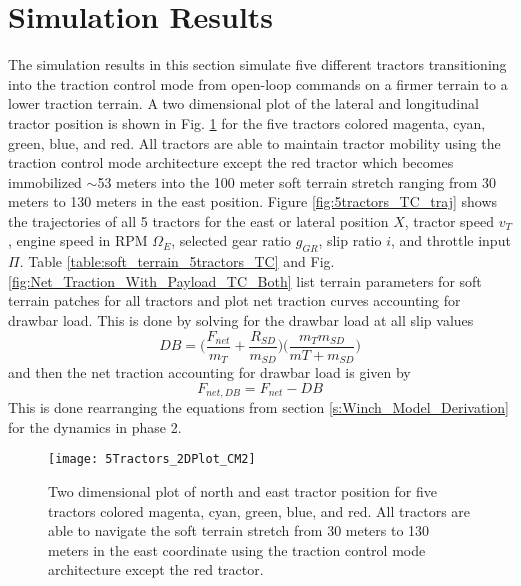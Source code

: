 \section{Simulation Results}
\label{s:SRTC}
The simulation results in this section simulate five different tractors transitioning into the traction control mode from open-loop commands on a firmer terrain to a lower traction terrain. A two dimensional plot of the lateral and longitudinal tractor position is shown in Fig. \ref{fig:5Tractors_2DPlot_CM2} for the five tractors colored magenta, cyan, green, blue, and red. All tractors are able to maintain tractor mobility using the traction control mode architecture except the red tractor which becomes immobilized $\sim$53 meters into the 100 meter soft terrain stretch ranging from 30 meters to 130 meters in the east position. Figure \ref{fig:5tractors_TC_traj} shows the trajectories of all 5 tractors for the east or lateral position $X$, tractor speed $v_T$, engine speed in RPM $\Omega_E$, selected gear ratio $g_{GR}$, slip ratio $i$, and throttle input $\Pi$. Table \ref{table:soft_terrain_5tractors_TC} and Fig. \ref{fig:Net_Traction_With_Payload_TC_Both} list terrain parameters for soft terrain patches for all tractors and plot net traction curves accounting for drawbar load. This is done by solving for the drawbar load at all slip values
\begin{equation}
    DB = \Bigg( \frac{F_{net}}{m_T} + \frac{R_{SD}}{m_{SD}}\Bigg)  \Bigg( \frac{m_Tm_{SD}}{mT+m_{SD}} \Bigg)
\end{equation}
and then the net traction accounting for drawbar load is given by 
\begin{equation*}
    F_{net,DB} = F_{net} - DB
\end{equation*}
This is done rearranging the equations from section \ref{s:Winch_Model_Derivation} for the dynamics in phase 2.
\begin{figure}[htbp]
    \centering
    \texttt{[image: 5Tractors\_2DPlot\_CM2]}
    \caption{Two dimensional plot of north and east tractor position for five tractors colored magenta, cyan, green, blue, and red. All tractors are able to navigate the soft terrain stretch from 30 meters to 130 meters in the east coordinate using the traction control mode architecture except the red tractor.}
    \label{fig:5Tractors_2DPlot_CM2}
\end{figure}
